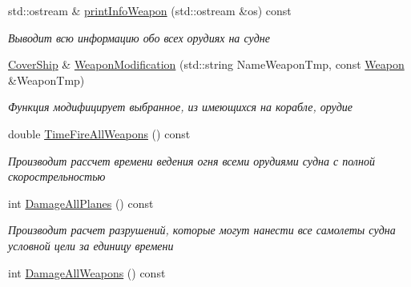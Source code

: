 \begin{DoxyCompactItemize}
\mbox{\label{class_aircraft_carrier_group_1_1_cover_ship_ae77dfb4b38d2d338c6189d10f1a56dc9}} 
std\+::ostream \& \mbox{\hyperlink{class_aircraft_carrier_group_1_1_cover_ship_ae77dfb4b38d2d338c6189d10f1a56dc9}{print\+Info\+Weapon}} (std\+::ostream \&os) const
\begin{DoxyCompactList}\small\item\em Выводит всю информацию обо всех орудиях на судне \end{DoxyCompactList}\item 
\mbox{\hyperlink{class_aircraft_carrier_group_1_1_cover_ship}{Cover\+Ship}} \& \mbox{\hyperlink{class_aircraft_carrier_group_1_1_cover_ship_a135b4e20acbdb6bfbcb2cbb6df855d09}{Weapon\+Modification}} (std\+::string Name\+Weapon\+Tmp, const \mbox{\hyperlink{class_aircraft_carrier_group_1_1_weapon}{Weapon}} \&Weapon\+Tmp)
\begin{DoxyCompactList}\small\item\em Функция модифицирует выбранное, из имеющихся на корабле, орудие \end{DoxyCompactList}\item 
\mbox{\label{class_aircraft_carrier_group_1_1_cover_ship_abb7d3a8b6537811c8daf0574f6b7af59}} 
double \mbox{\hyperlink{class_aircraft_carrier_group_1_1_cover_ship_abb7d3a8b6537811c8daf0574f6b7af59}{Time\+Fire\+All\+Weapons}} () const
\begin{DoxyCompactList}\small\item\em Производит рассчет времени ведения огня всеми орудиями судна с полной скорострельностью \end{DoxyCompactList}\item 
int \mbox{\hyperlink{class_aircraft_carrier_group_1_1_cover_ship_a3a08ec471959146e36e3d6c2fccf2159}{Damage\+All\+Planes}} () const
\begin{DoxyCompactList}\small\item\em Производит расчет разрушений, которые могут нанести все самолеты судна условной цели за единицу времени \end{DoxyCompactList}\item 
\mbox{\label{class_aircraft_carrier_group_1_1_cover_ship_a2e880c60db67934fba685100eec7ec84}} 
int \mbox{\hyperlink{class_aircraft_carrier_group_1_1_cover_ship_a2e880c60db67934fba685100eec7ec84}{Damage\+All\+Weapons}} () const

\end{DoxyCompactItemize}
